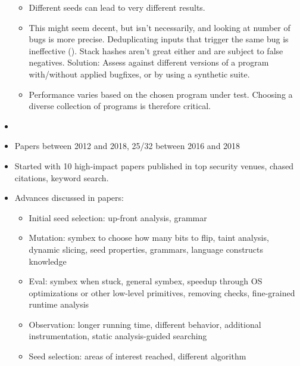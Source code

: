 \documentclass{article}
\begin{document}
\begin{itemize}
\begin{itemize}
          \item Different seeds can lead to very different results.
          \item {}\cite{EvaluatingFuzzTesting} This might seem decent, but isn't necessarily, and looking at number of bugs is more precise. Deduplicating inputs that trigger the same bug is ineffective (\cite{EvaluatingFuzzTesting}). Stack hashes aren't great either and are subject to false negatives. Solution: Assess against different versions of a program with/without applied bugfixes, or by using a synthetic suite.
          \item Performance varies based on the chosen program under test. Choosing a diverse collection of programs is therefore critical.
        \end{itemize}
  \item {}\cite{EvaluatingFuzzTesting}
  \item Papers between 2012 and 2018, 25/32 between 2016 and 2018
  \item Started with 10 high-impact papers published in top security venues, chased citations, keyword search.
  \item Advances discussed in papers:
        \begin{itemize}
          \item Initial seed selection: up-front analysis\cite{Skyfire, Orthrus, DIFUZE}, grammar\cite{QuickFuzz, QuickFuzz2}
          \item Mutation: symbex to choose how many bits to flip\cite{SYMFUZZ}, taint analysis\cite{Mayhem, Angora, Steelix, VUzzer}, dynamic slicing\cite{MutaGen}, seed properties\cite{SDF}, grammars\cite{SCADA, IMF}, language constructs knowledge\cite{Chizpurfle}
          \item Eval: symbex when stuck\cite{Driller, Mayhem}, general symbex\cite{S2F}, speedup through OS optimizations\cite{OS} or other low-level primitives\cite{IMF, VDF, kAFL}, removing checks\cite{TFuzz}, fine-grained runtime analysis\cite{MEDS}
          \item Observation: longer running time\cite{SlowFuzz}, different behavior\cite{NEZHA}, additional instrumentation\cite{Steelix, Angora}, static analysis-guided searching\cite{Dowser, VUzzer}
          \item Seed selection: areas of interest reached\cite{AFLGo, CGF, FairFuzz, VUzzer}, different algorithm\cite{SeedSelection, Scheduling}
        \end{itemize}
\end{itemize}
\end{document}
